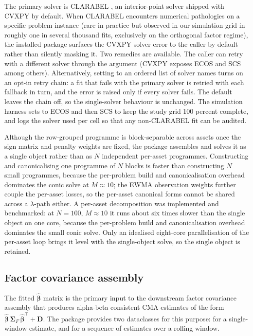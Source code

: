 \documentclass[article]{jss}
\begin{document}
The primary solver is CLARABEL \citep{Goulart+Chen:2024}, an
interior-point solver shipped with CVXPY by default. When CLARABEL
encounters numerical pathologies on a specific problem instance (rare
in practice but observed in our simulation grid in roughly one in
several thousand fits, exclusively on the orthogonal factor regime),
the installed package surfaces the CVXPY solver error to the caller by
default rather than silently masking it. Two remedies are available. The
caller can retry with a different solver through the 
argument (CVXPY exposes ECOS and SCS among others). Alternatively, setting
 to an ordered list of solver names turns on an
opt-in retry chain: a fit that fails with the primary solver is retried
with each fallback in turn, and the error is raised only if every solver
fails. The default leaves the chain off, so the single-solver behaviour is
unchanged. The simulation harness sets  to ECOS and
then SCS to keep the study grid 100 percent complete, and logs the solver
used per cell so that any non-CLARABEL fit can be audited.

Although the row-grouped programme is block-separable across assets once
the sign matrix and penalty weights are fixed, the package assembles and
solves it as a single object rather than as $N$ independent per-asset
programmes. Constructing and canonicalising one programme of $N$ blocks is
faster than constructing $N$ small programmes, because the per-problem
build and canonicalisation overhead dominates the conic solve at
$M \approx 10$; the EWMA observation weights further couple the per-asset
losses, so the per-asset canonical forms cannot be shared across a
$\lambda$-path either. A per-asset decomposition was implemented and benchmarked: at $N = 100$, $M \approx 10$ it runs about six times slower than the single object on one core, because the per-problem build and canonicalisation overhead dominates the small conic solve. Only an idealised eight-core parallelisation of the per-asset loop brings it level with the single-object solve, so the single object is retained.


\subsection[Factor covariance assembly]{Factor covariance assembly} \label{sec:factor-covar}

The fitted $\hat{\bm{\beta}}$ matrix is the primary input to the
downstream factor covariance assembly that produces alpha-beta
consistent CMA estimates of the form $\hat{\bm{\beta}}\, \bm{\Sigma}_F\, \hat{\bm{\beta}}^\top + \bm{D}$.
The package provides two dataclasses for this purpose:
 for a single-window estimate, and
 for a sequence of estimates over a
rolling window.
\end{document}

